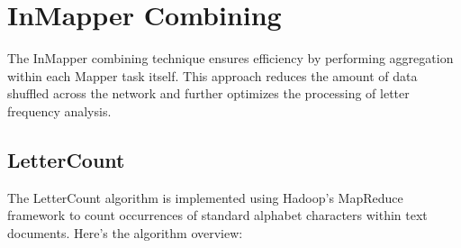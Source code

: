 \newpage



\section{InMapper Combining}
The InMapper combining technique ensures efficiency by performing aggregation within each Mapper task itself. This approach reduces the amount of data shuffled across the network and further optimizes the processing of letter frequency analysis.


\subsection{LetterCount}

The LetterCount algorithm is implemented using Hadoop's MapReduce framework to count occurrences of standard alphabet characters within text documents. Here’s the algorithm overview:


